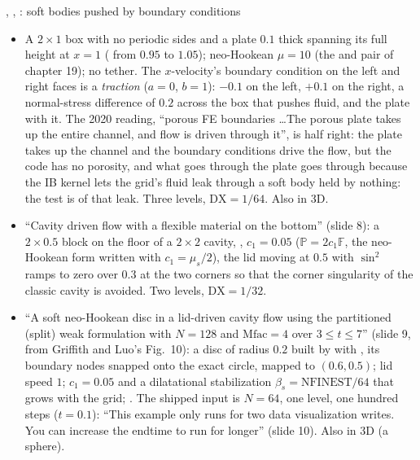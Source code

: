\documentclass[aspectratio=169,11pt]{beamer}
\begin{document}
\begin{frame}{, , : soft bodies pushed by boundary conditions}
\label{fr:ex234}
\scriptsize
\begin{itemize}
  \item {} A $2\times1$ box with no periodic sides and a plate $0.1$ thick spanning its full height at $x = 1$ ( from $0.95$ to $1.05$); neo-Hookean $\mu = 10$ (the  and  pair of chapter 19); no tether. The $x$-velocity's boundary condition on the left and right faces is a \emph{traction} ($a = 0$, $b = 1$): $-0.1$ on the left, $+0.1$ on the right, a normal-stress difference of $0.2$ across the box that pushes fluid, and the plate with it. The 2020 reading, ``porous FE boundaries \ldots The porous plate takes up the entire channel, and flow is driven through it'', is half right: the plate takes up the channel and the boundary conditions drive the flow, but the code has no porosity, and what goes through the plate goes through because the IB kernel lets the grid's fluid leak through a soft body held by nothing: the test is of that leak. Three levels, $\mathrm{DX} = 1/64$. Also in 3D.
  \item {} ``Cavity driven flow with a flexible material on the bottom'' (slide 8): a $2\times0.5$ block on the floor of a $2\times2$ cavity, , $c_1 = 0.05$ ($\mathbb{P} = 2c_1\mathbb{F}$, the neo-Hookean form written with $c_1 = \mu_s/2$), the lid moving at $0.5$ with $\sin^2$ ramps to zero over $0.3$ at the two corners so that the corner singularity of the classic cavity is avoided. Two levels, $\mathrm{DX} = 1/32$.
  \item {} ``A soft neo-Hookean disc in a lid-driven cavity flow using the partitioned (split) weak formulation with $N = 128$ and $\mathrm{Mfac} = 4$ over $3 \le t \le 7$'' (slide 9, from Griffith and Luo's Fig.\ 10): a disc of radius $0.2$ built by  with , its boundary nodes snapped onto the exact circle, mapped to $(0.6, 0.5)$; lid speed $1$; $c_1 = 0.05$ and a dilatational stabilization $\beta_s = \mathrm{NFINEST}/64$ that grows with the grid; . The shipped input is $N = 64$, one level, one hundred steps ($t = 0.1$): ``This example only runs for two data visualization writes. You can increase the endtime to run for longer'' (slide 10). Also in 3D (a sphere).
\end{itemize}
\end{frame}
\end{document}

